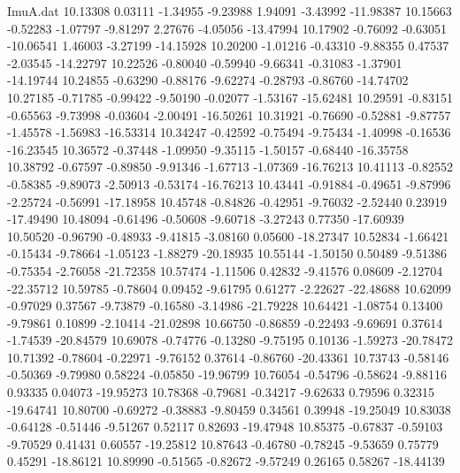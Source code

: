 \begin{filecontents}{ImuA.dat}
  10.13308    0.03111   -1.34955   -9.23988    1.94091   -3.43992  -11.98387
  10.15663   -0.52283   -1.07797   -9.81297    2.27676   -4.05056  -13.47994
  10.17902   -0.76092   -0.63051  -10.06541    1.46003   -3.27199  -14.15928
  10.20200   -1.01216   -0.43310   -9.88355    0.47537   -2.03545  -14.22797
  10.22526   -0.80040   -0.59940   -9.66341   -0.31083   -1.37901  -14.19744
  10.24855   -0.63290   -0.88176   -9.62274   -0.28793   -0.86760  -14.74702
  10.27185   -0.71785   -0.99422   -9.50190   -0.02077   -1.53167  -15.62481
  10.29591   -0.83151   -0.65563   -9.73998   -0.03604   -2.00491  -16.50261
  10.31921   -0.76690   -0.52881   -9.87757   -1.45578   -1.56983  -16.53314
  10.34247   -0.42592   -0.75494   -9.75434   -1.40998   -0.16536  -16.23545
  10.36572   -0.37448   -1.09950   -9.35115   -1.50157   -0.68440  -16.35758
  10.38792   -0.67597   -0.89850   -9.91346   -1.67713   -1.07369  -16.76213
  10.41113   -0.82552   -0.58385   -9.89073   -2.50913   -0.53174  -16.76213
  10.43441   -0.91884   -0.49651   -9.87996   -2.25724   -0.56991  -17.18958
  10.45748   -0.84826   -0.42951   -9.76032   -2.52440    0.23919  -17.49490
  10.48094   -0.61496   -0.50608   -9.60718   -3.27243    0.77350  -17.60939
  10.50520   -0.96790   -0.48933   -9.41815   -3.08160    0.05600  -18.27347
  10.52834   -1.66421   -0.15434   -9.78664   -1.05123   -1.88279  -20.18935
  10.55144   -1.50150    0.50489   -9.51386   -0.75354   -2.76058  -21.72358
  10.57474   -1.11506    0.42832   -9.41576    0.08609   -2.12704  -22.35712
  10.59785   -0.78604    0.09452   -9.61795    0.61277   -2.22627  -22.48688
  10.62099   -0.97029    0.37567   -9.73879   -0.16580   -3.14986  -21.79228
  10.64421   -1.08754    0.13400   -9.79861    0.10899   -2.10414  -21.02898
  10.66750   -0.86859   -0.22493   -9.69691    0.37614   -1.74539  -20.84579
  10.69078   -0.74776   -0.13280   -9.75195    0.10136   -1.59273  -20.78472
  10.71392   -0.78604   -0.22971   -9.76152    0.37614   -0.86760  -20.43361
  10.73743   -0.58146   -0.50369   -9.79980    0.58224   -0.05850  -19.96799
  10.76054   -0.54796   -0.58624   -9.88116    0.93335    0.04073  -19.95273
  10.78368   -0.79681   -0.34217   -9.62633    0.79596    0.32315  -19.64741
  10.80700   -0.69272   -0.38883   -9.80459    0.34561    0.39948  -19.25049
  10.83038   -0.64128   -0.51446   -9.51267    0.52117    0.82693  -19.47948
  10.85375   -0.67837   -0.59103   -9.70529    0.41431    0.60557  -19.25812
  10.87643   -0.46780   -0.78245   -9.53659    0.75779    0.45291  -18.86121
  10.89990   -0.51565   -0.82672   -9.57249    0.26165    0.58267  -18.44139

\end{filecontents}
